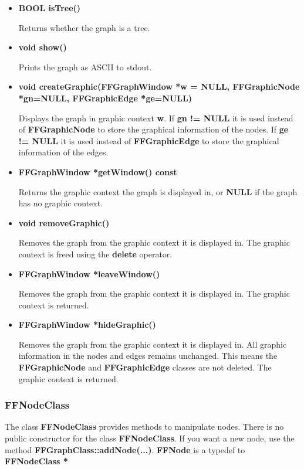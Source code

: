 \begin{itemize}
\item{\bf BOOL isTree()}

Returns whether the graph is a tree.

\item{\bf void show()}

Prints the graph as ASCII to stdout.

\item{\bf void createGraphic(FFGraphWindow *w = NULL, FFGraphicNode 
	*gn=NULL, FFGraphicEdge *ge=NULL)}

Displays the graph in graphic context {\bf w}. If {\bf gn != NULL} it
is used instead of {\bf FFGraphicNode} to store the graphical
information of the nodes. If {\bf ge != NULL} it
is used instead of {\bf FFGraphicEdge} to store the graphical
information of the edges.

\item{\bf FFGraphWindow *getWindow() const}

Returns the graphic context the graph is displayed in, or {\bf NULL}
if the graph has no graphic context.

\item{\bf void removeGraphic()}

Removes the graph from the graphic context it is displayed in.
The graphic context is freed using the {\bf delete} operator.

\item{\bf FFGraphWindow *leaveWindow()}

Removes the graph from the graphic context it is displayed in.
The graphic context is returned.

\item{\bf FFGraphWindow *hideGraphic()}

Removes the graph from the graphic context it is displayed in.  All
graphic information in the nodes and edges remains unchanged. This
means the {\bf FFGraphicNode} and {\bf FFGraphicEdge} classes are not
deleted.  The graphic context is returned.

\end{itemize}

\subsubsection{FFNodeClass}

The class {\bf FFNodeClass} provides methods to manipulate nodes.
There is no public constructor for the class {\bf FFNodeClass}.
If you want a new node, use the method {\bf
  FFGraphClass::addNode(...)}.  {\bf FFNode} is a typedef to {\bf
  FFNodeClass *}

